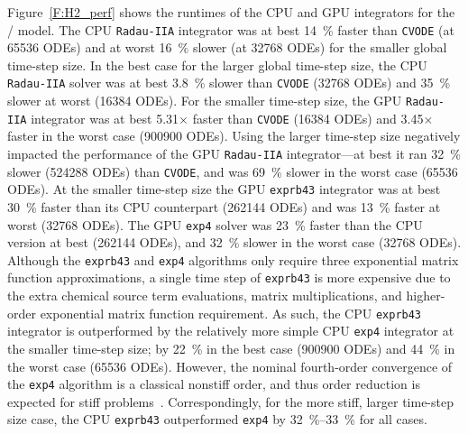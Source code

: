 \documentclass[final,twocolumn]{elsarticle}
\begin{document}
Figure~\ref{F:H2_perf} shows the runtimes of the CPU and GPU integrators for the \slash{} model.
The CPU \texttt{Radau-IIA} integrator was at best \SI{14}{\percent} faster than \texttt{CVODE} (at \num{65536} ODEs) and at worst \SI{16}{\percent} slower (at \num{32768} ODEs) for the smaller global time-step size.
In the best case for the larger global time-step size, the CPU \texttt{Radau-IIA} solver was at best \SI{3.8}{\percent} slower than \texttt{CVODE} (\num{32768} ODEs) and \SI{35}{\percent} slower at worst (\num{16384} ODEs).
For the smaller time-step size, the GPU \texttt{Radau-IIA} integrator was at best \num{5.31}$\times$ faster than \texttt{CVODE} (\num{16384} ODEs) and \num{3.45}$\times$ faster in the worst case (\num{900900} ODEs).
Using the larger time-step size negatively impacted the performance of the GPU \texttt{Radau-IIA} integrator---at best it ran \SI{32}{\percent} slower (\num{524288} ODEs) than \texttt{CVODE}, and was \SI{69}{\percent} slower in the worst case (\num{65536} ODEs).
At the smaller time-step size the GPU \texttt{exprb43} integrator was at best \SI{30}{\percent} faster than its CPU counterpart (\num{262144} ODEs) and was \SI{13}{\percent} faster at worst (\num{32768} ODEs). 
The GPU \texttt{exp4} solver was \SI{23}{\percent} faster than the CPU version at best (\num{262144} ODEs), and \SI{32}{\percent} slower in the worst case (\num{32768} ODEs).
Although the \texttt{exprb43} and \texttt{exp4} algorithms only require three exponential matrix function approximations, a single time step of \texttt{exprb43} is more expensive due to the extra chemical source term evaluations, matrix multiplications, and higher-order exponential matrix function requirement.
As such, the CPU \texttt{exprb43} integrator is outperformed by the relatively more simple CPU \texttt{exp4} integrator at the smaller time-step size; by \SI{22}{\percent} in the best case (\num{900900} ODEs) and \SI{44}{\percent} in the worst case (\num{65536} ODEs).
However, the nominal fourth-order convergence of the \texttt{exp4} algorithm is a classical nonstiff order, and thus order reduction is expected for stiff problems~\cite{ANU:7701740,Bisetti:2012jw}.
Correspondingly, for the more stiff, larger time-step size case, the CPU \texttt{exprb43} outperformed \texttt{exp4} by \SIrange{32}{33}{\percent} for all cases.
\end{document}
